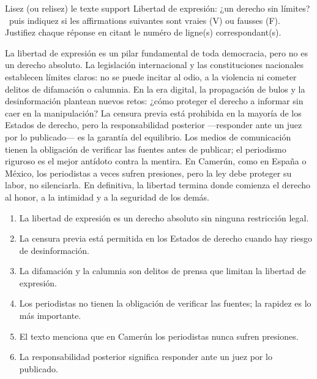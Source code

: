 \documentclass[11pt]{article}
\begin{document}
\begin{exercice}
Lisez (ou relisez) le texte support \og Libertad de expresión: ¿un derecho sin límites? \fg\ puis indiquez si les affirmations suivantes sont vraies (V) ou fausses (F). Justifiez chaque réponse en citant le numéro de ligne(s) correspondant(s).

\begin{textebox}
La libertad de expresión es un pilar fundamental de toda democracia, pero no es un derecho absoluto. La legislación internacional y las constituciones nacionales establecen límites claros: no se puede incitar al odio, a la violencia ni cometer delitos de difamación o calumnia. En la era digital, la propagación de bulos y la desinformación plantean nuevos retos: ¿cómo proteger el derecho a informar sin caer en la manipulación? La censura previa está prohibida en la mayoría de los Estados de derecho, pero la responsabilidad posterior —responder ante un juez por lo publicado— es la garantía del equilibrio. Los medios de comunicación tienen la obligación de verificar las fuentes antes de publicar; el periodismo riguroso es el mejor antídoto contra la mentira. En Camerún, como en España o México, los periodistas a veces sufren presiones, pero la ley debe proteger su labor, no silenciarla. En definitiva, la libertad termina donde comienza el derecho al honor, a la intimidad y a la seguridad de los demás.
\end{textebox}

\begin{enumerate}
    \item La libertad de expresión es un derecho absoluto sin ninguna restricción legal.
    \item La censura previa está permitida en los Estados de derecho cuando hay riesgo de desinformación.
    \item La difamación y la calumnia son delitos de prensa que limitan la libertad de expresión.
    \item Los periodistas no tienen la obligación de verificar las fuentes; la rapidez es lo más importante.
    \item El texto menciona que en Camerún los periodistas nunca sufren presiones.
    \item La responsabilidad posterior significa responder ante un juez por lo publicado.
\end{enumerate}
\end{exercice}
\end{document}

